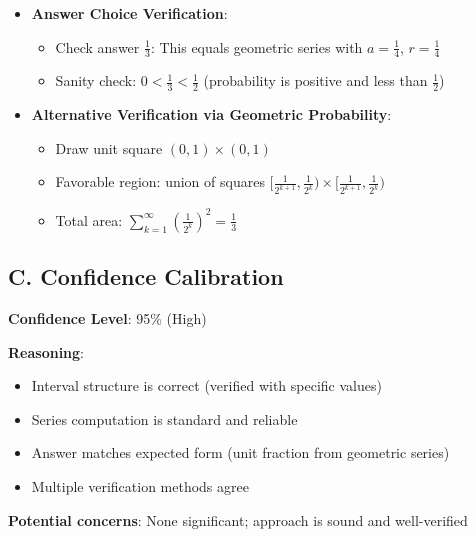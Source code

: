 \documentclass[11pt]{article}
\begin{document}
\begin{verificationbox}
\begin{itemize}[leftmargin=*]
    \item \textbf{Answer Choice Verification}:
    \begin{itemize}
        \item Check answer $\frac{1}{3}$: This equals geometric series with $a = \frac{1}{4}$, $r = \frac{1}{4}$ \checkmark
        \item Sanity check: $0 < \frac{1}{3} < \frac{1}{2}$ (probability is positive and less than $\frac{1}{2}$) \checkmark
    \end{itemize}
    
    \item \textbf{Alternative Verification via Geometric Probability}:
    \begin{itemize}
        \item Draw unit square $(0,1) \times (0,1)$
        \item Favorable region: union of squares $[\frac{1}{2^{k+1}}, \frac{1}{2^k}) \times [\frac{1}{2^{k+1}}, \frac{1}{2^k})$
        \item Total area: $\sum_{k=1}^{\infty} (\frac{1}{2^k})^2 = \frac{1}{3}$ \checkmark
    \end{itemize}
\end{itemize}

\subsection*{C. Confidence Calibration}
\textbf{Confidence Level}: 95\% (High)

\textbf{Reasoning}:
\begin{itemize}
    \item Interval structure is correct (verified with specific values)
    \item Series computation is standard and reliable
    \item Answer matches expected form (unit fraction from geometric series)
    \item Multiple verification methods agree
\end{itemize}

\textbf{Potential concerns}: None significant; approach is sound and well-verified
\end{verificationbox}
\end{document}
